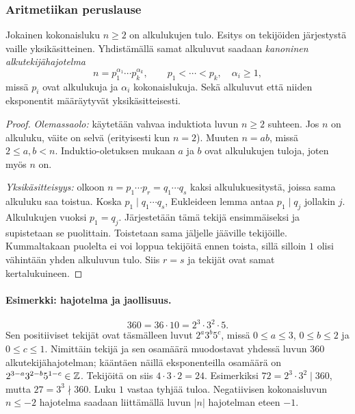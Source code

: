 \documentclass[11pt,a4paper]{amsart}
\begin{document}
\subsubsection{Aritmetiikan peruslause}
\begin{theorem}
  Jokainen kokonaisluku $n\ge2$ on alkulukujen tulo.
  Esitys on tekijöiden järjestystä vaille yksikäsitteinen.
  Yhdistämällä samat alkuluvut saadaan \emph{kanoninen alkutekijähajotelma}
  \[
    \boxed{n=p_1^{\alpha_1}\cdots p_k^{\alpha_k},\qquad
    p_1<\cdots<p_k,\quad \alpha_i\ge1,}
  \]
  missä $p_i$ ovat alkulukuja ja $\alpha_i$ kokonaislukuja.
  Sekä alkuluvut että niiden eksponentit määräytyvät yksikäsitteisesti.
\end{theorem}
\begin{proof}
  \emph{Olemassaolo:} käytetään vahvaa induktiota luvun $n\ge2$
  suhteen. Jos $n$ on alkuluku, väite on selvä (erityisesti kun
  $n=2$). Muuten $n=ab$, missä $2\le a,b<n$. Induktio-oletuksen
  mukaan $a$ ja $b$ ovat alkulukujen tuloja, joten myös $n$ on.

  \emph{Yksikäsitteisyys:} olkoon
  $n=p_1\cdots p_r=q_1\cdots q_s$ kaksi alkulukuesitystä,
  joissa sama alkuluku saa toistua. Koska $p_1\mid q_1\cdots q_s$,
  Eukleideen lemma antaa $p_1\mid q_j$ jollakin $j$.
  Alkulukujen vuoksi $p_1=q_j$. Järjestetään tämä tekijä ensimmäiseksi
  ja supistetaan se puolittain. Toistetaan sama jäljelle jääville
  tekijöille. Kummaltakaan puolelta ei voi loppua tekijöitä ennen
  toista, sillä silloin $1$ olisi vähintään yhden alkuluvun tulo.
  Siis $r=s$ ja tekijät ovat samat kertalukuineen.
\end{proof}

\paragraph{Esimerkki: hajotelma ja jaollisuus.}
\[
  360=36\cdot10=2^3\cdot3^2\cdot5.
\]
Sen positiiviset tekijät ovat täsmälleen luvut
$2^a3^b5^c$, missä $0\le a\le3$, $0\le b\le2$ ja $0\le c\le1$.
Nimittäin tekijä ja sen osamäärä muodostavat yhdessä luvun $360$
alkutekijähajotelman; kääntäen näillä eksponenteilla osamäärä on
$2^{3-a}3^{2-b}5^{1-c}\in\mathbb{Z}$.
Tekijöitä on siis $4\cdot3\cdot2=24$.
Esimerkiksi $72=2^3\cdot3^2\mid360$, mutta $27=3^3\nmid360$.
Luku $1$ vastaa tyhjää tuloa. Negatiivisen kokonaisluvun
$n\le-2$ hajotelma saadaan liittämällä luvun $|n|$ hajotelman eteen $-1$.
\end{document}
